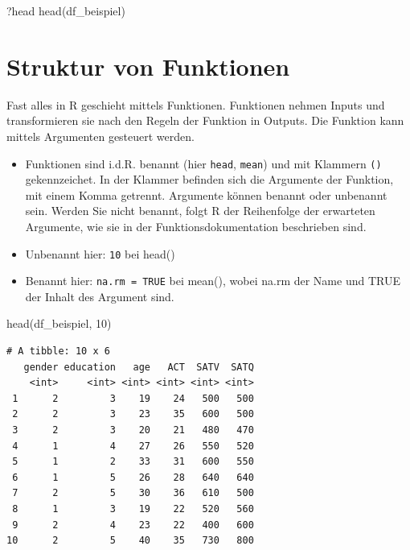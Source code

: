 \documentclass[
  letterpaper,
  DIV=11,
  numbers=noendperiod]{scrreprt}
\newenvironment{Shaded}{\begin{snugshade}}{\end{snugshade}}
\newcommand{\DecValTok}[1]{\textcolor[rgb]{0.68,0.00,0.00}{#1}}
\newcommand{\FunctionTok}[1]{\textcolor[rgb]{0.28,0.35,0.67}{#1}}
\newcommand{\NormalTok}[1]{\textcolor[rgb]{0.00,0.23,0.31}{#1}}
\providecommand{\tightlist}{%
  \setlength{\itemsep}{0pt}\setlength{\parskip}{0pt}}\usepackage{longtable,booktabs,array}
\begin{document}
\begin{Shaded}
\begin{Highlighting}[]
\NormalTok{?head}
\FunctionTok{head}\NormalTok{(df\_beispiel)}
\end{Highlighting}
\end{Shaded}

\section{Struktur von Funktionen}\label{struktur-von-funktionen}

Fast alles in R geschieht mittels Funktionen. Funktionen nehmen Inputs
und transformieren sie nach den Regeln der Funktion in Outputs. Die
Funktion kann mittels Argumenten gesteuert werden.

\begin{itemize}
\tightlist
\item
  Funktionen sind i.d.R. benannt (hier \texttt{head}, \texttt{mean}) und
  mit Klammern \texttt{()} gekennzeichet. In der Klammer befinden sich
  die Argumente der Funktion, mit einem Komma getrennt. Argumente können
  benannt oder unbenannt sein. Werden Sie nicht benannt, folgt R der
  Reihenfolge der erwarteten Argumente, wie sie in der
  Funktionsdokumentation beschrieben sind.
\item
  Unbenannt hier: \texttt{10} bei head()
\item
  Benannt hier: \texttt{na.rm\ =\ TRUE} bei mean(), wobei na.rm der Name
  und TRUE der Inhalt des Argument sind.
\end{itemize}

\begin{Shaded}
\begin{Highlighting}[]
\FunctionTok{head}\NormalTok{(df\_beispiel, }\DecValTok{10}\NormalTok{)}
\end{Highlighting}
\end{Shaded}

\begin{verbatim}
# A tibble: 10 x 6
   gender education   age   ACT  SATV  SATQ
    <int>     <int> <int> <int> <int> <int>
 1      2         3    19    24   500   500
 2      2         3    23    35   600   500
 3      2         3    20    21   480   470
 4      1         4    27    26   550   520
 5      1         2    33    31   600   550
 6      1         5    26    28   640   640
 7      2         5    30    36   610   500
 8      1         3    19    22   520   560
 9      2         4    23    22   400   600
10      2         5    40    35   730   800
\end{verbatim}
\end{document}

